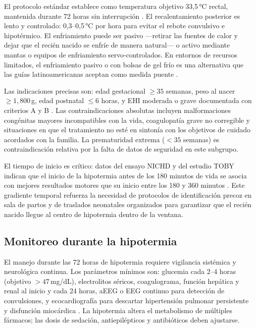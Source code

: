 \documentclass[12pt]{article}
\begin{document}
El protocolo estándar establece como temperatura objetivo 33,5\,°C rectal, mantenida
durante 72 horas sin interrupción \parencite{jacobs2013}. El recalentamiento posterior
es lento y controlado: 0,3--0,5\,°C por hora para evitar el rebote convulsivo e
hipotérmico. El enfriamiento puede ser pasivo ---retirar las fuentes de calor y dejar
que el recién nacido se enfríe de manera natural--- o activo mediante mantas o equipos
de enfriamiento servo-controlados. En entornos de recursos limitados, el enfriamiento
pasivo o con bolsas de gel frío es una alternativa que las guías latinoamericanas
aceptan como medida puente \parencite{alsepneo2021}.

Las indicaciones precisas son: edad gestacional $\geq 35$ semanas, peso al nacer
$\geq 1{,}800$\,g, edad postnatal $\leq 6$ horas, y EHI moderada o grave documentada
con criterios A y B \parencite{statpearls2024}. Las contraindicaciones absolutas
incluyen malformaciones congénitas mayores incompatibles con la vida, coagulopatía
grave no corregible y situaciones en que el tratamiento no esté en sintonía con los
objetivos de cuidado acordados con la familia. La prematuridad extrema
($< 35$ semanas) es contraindicación relativa por la falta de datos de seguridad
en este subgrupo.

El tiempo de inicio es crítico: datos del ensayo NICHD y del estudio TOBY indican que
el inicio de la hipotermia antes de los 180 minutos de vida se asocia con mejores
resultados motores que su inicio entre los 180 y 360 minutos \parencite{shankaran2014}.
Este gradiente temporal refuerza la necesidad de protocolos de identificación precoz
en sala de partos y de traslados neonatales organizados para garantizar que el recién
nacido llegue al centro de hipotermia dentro de la ventana.

\subsection{Monitoreo durante la hipotermia}
\label{subsec:monitoreo}

El manejo durante las 72 horas de hipotermia requiere vigilancia sistémica y
neurológica continua. Los parámetros mínimos son: glucemia cada 2--4 horas (objetivo
$> 47$\,mg/dL), electrolitos séricos, coagulograma, función hepática y renal al inicio
y cada 24 horas, aEEG o EEG continuo para detección de convulsiones, y ecocardiografía
para descartar hipertensión pulmonar persistente y disfunción miocárdica
\parencite{alsepneo2021}. La hipotermia altera el metabolismo de múltiples fármacos;
las dosis de sedación, antiepilépticos y antibióticos deben ajustarse.
\end{document}

